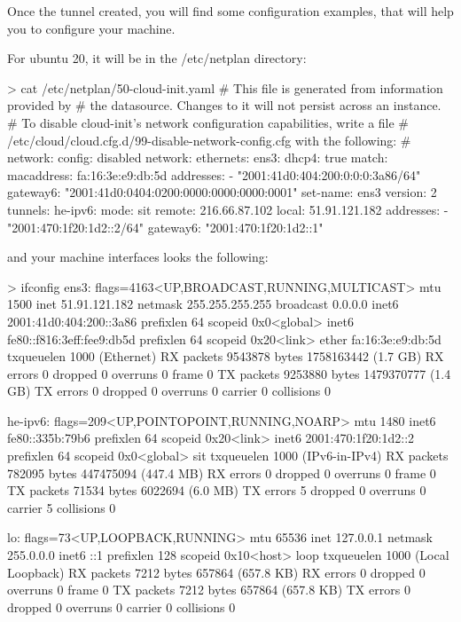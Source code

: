 Once the tunnel created, you will find some configuration examples, that will help you to configure your machine.

For ubuntu 20, it will be in the /etc/netplan directory:

\begin{termc}[backgroundcolor=\color{gray!10}, basicstyle=\ttfamily\small, escapechar=@]
> cat /etc/netplan/50-cloud-init.yaml
# This file is generated from information provided by
# the datasource.  Changes to it will not persist across an instance.
# To disable cloud-init's network configuration capabilities, write a file
# /etc/cloud/cloud.cfg.d/99-disable-network-config.cfg with the following:
# network: {config: disabled}
network:
    ethernets:
        ens3:
            dhcp4: true
            match:
                macaddress: fa:16:3e:e9:db:5d
            addresses:
            - "2001:41d0:404:200:0:0:0:3a86/64"
            gateway6: "2001:41d0:0404:0200:0000:0000:0000:0001"
            set-name: ens3
    version: 2
    tunnels:
      he-ipv6:
       mode: sit
       remote: 216.66.87.102
       local: 51.91.121.182
       addresses:
         - "2001:470:1f20:1d2::2/64"
       gateway6: "2001:470:1f20:1d2::1"
\end{termc}

and your machine interfaces looks the following:



\begin{termc}[backgroundcolor=\color{gray!10}, basicstyle=\ttfamily\small, escapechar=@]
> ifconfig
ens3: flags=4163<UP,BROADCAST,RUNNING,MULTICAST>  mtu 1500
        inet 51.91.121.182  netmask 255.255.255.255  broadcast 0.0.0.0
        inet6 2001:41d0:404:200::3a86  prefixlen 64  scopeid 0x0<global>
        inet6 fe80::f816:3eff:fee9:db5d  prefixlen 64  scopeid 0x20<link>
        ether fa:16:3e:e9:db:5d  txqueuelen 1000  (Ethernet)
        RX packets 9543878  bytes 1758163442 (1.7 GB)
        RX errors 0  dropped 0  overruns 0  frame 0
        TX packets 9253880  bytes 1479370777 (1.4 GB)
        TX errors 0  dropped 0 overruns 0  carrier 0  collisions 0

he-ipv6: flags=209<UP,POINTOPOINT,RUNNING,NOARP>  mtu 1480
        inet6 fe80::335b:79b6  prefixlen 64  scopeid 0x20<link>
        inet6 2001:470:1f20:1d2::2  prefixlen 64  scopeid 0x0<global>
        sit  txqueuelen 1000  (IPv6-in-IPv4)
        RX packets 782095  bytes 447475094 (447.4 MB)
        RX errors 0  dropped 0  overruns 0  frame 0
        TX packets 71534  bytes 6022694 (6.0 MB)
        TX errors 5  dropped 0 overruns 0  carrier 5  collisions 0

lo: flags=73<UP,LOOPBACK,RUNNING>  mtu 65536
        inet 127.0.0.1  netmask 255.0.0.0
        inet6 ::1  prefixlen 128  scopeid 0x10<host>
        loop  txqueuelen 1000  (Local Loopback)
        RX packets 7212  bytes 657864 (657.8 KB)
        RX errors 0  dropped 0  overruns 0  frame 0
        TX packets 7212  bytes 657864 (657.8 KB)
        TX errors 0  dropped 0 overruns 0  carrier 0  collisions 0
\end{termc}

